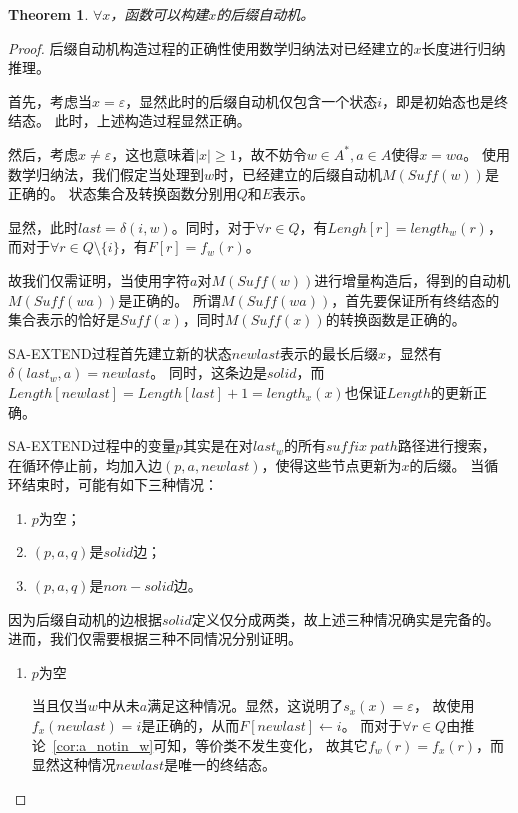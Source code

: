 \documentclass[UTF8]{ctexart}
\newtheorem{thm}{Theorem}[subsection]
\theoremstyle{definition}
\theoremstyle{remark}
\numberwithin{equation}{subsection}
\newcommand{\Suff}{\textit{Suff}}
\begin{document}
	\begin{thm}
	\label{thm:sam_build_right}
		$\forall x$，函数可以构建$x$的后缀自动机。
	\end{thm}
	\begin{proof}
		后缀自动机构造过程的正确性使用数学归纳法对已经建立的$x$长度进行归纳推理。
		
		首先，考虑当$x = \varepsilon$，显然此时的后缀自动机仅包含一个状态$i$，即是初始态也是终结态。
		此时，上述构造过程显然正确。
		
		然后，考虑$x \neq \varepsilon$，这也意味着$|x| \ge 1$，故不妨令$w \in A^*, a \in A$使得$x = wa$。
		使用数学归纳法，我们假定当处理到$w$时，已经建立的后缀自动机$M(\Suff(w))$是正确的。
		状态集合及转换函数分别用$Q$和$E$表示。
		
		显然，此时$last = \delta(i,w)$。同时，对于$\forall r \in Q$，有$Lengh[r] = length_w(r)$，
		而对于$\forall r \in Q \setminus \{i\}$，有$F[r] = f_w(r)$。
		
		故我们仅需证明，当使用字符$a$对$M(\Suff(w))$进行增量构造后，得到的自动机$M(\Suff(wa))$是正确的。
		所谓$M(\Suff(wa))$，首先要保证所有终结态的集合表示的恰好是$\Suff(x)$，同时$M(\Suff(x))$的转换函数是正确的。
		
		SA-EXTEND过程首先建立新的状态$newlast$表示的最长后缀$x$，显然有$\delta(last_w, a) = newlast$。
		同时，这条边是$solid$，而$Length[newlast] = Length[last] + 1 = length_x(x)$也保证$Length$的更新正确。
		
		SA-EXTEND过程中的变量$p$其实是在对$last_w$的所有$suffix\ path$路径进行搜索，
		在循环停止前，均加入边$(p, a, newlast)$，使得这些节点更新为$x$的后缀。
		当循环结束时，可能有如下三种情况：
		\begin{enumerate}[(1)]
			\item $p$为空；
			\item $(p, a, q)$是$solid$边；
			\item $(p, a, q)$是$non-solid$边。
		\end{enumerate}
		
		因为后缀自动机的边根据$solid$定义仅分成两类，故上述三种情况确实是完备的。
		进而，我们仅需要根据三种不同情况分别证明。
		\begin{enumerate}
			\item $p$为空
			
			当且仅当$w$中从未$a$满足这种情况。显然，这说明了$s_x(x) = \varepsilon$，
			故使用$f_x(newlast) = i$是正确的，从而$F[newlast] \leftarrow i$。
			而对于$\forall r \in Q$由推论~\ref{cor:a_notin_w}可知，等价类不发生变化，
			故其它$f_w(r) = f_x(r)$，而显然这种情况$newlast$是唯一的终结态。
			

\end{enumerate}
\end{proof}
\end{document}
